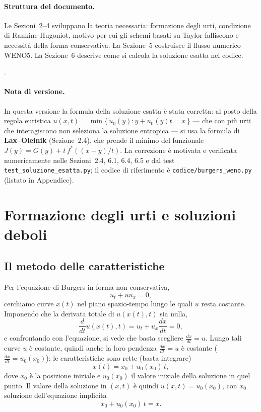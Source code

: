 \documentclass[12pt]{article}
\begin{document}
\paragraph{Struttura del documento.} Le Sezioni~2--4 sviluppano la teoria necessaria: formazione degli urti, condizione di Rankine-Hugoniot, motivo per cui gli schemi basati su Taylor falliscono e necessità della forma conservativa. La Sezione~5 costruisce il flusso numerico WENO5. La Sezione~6 descrive come si calcola la soluzione esatta nel codice. .

\paragraph{Nota di versione.} In questa versione la formula della soluzione esatta è stata
corretta: al posto della regola euristica
\(u(x,t)=\min\{\,u_0(y): y+u_0(y)t=x\,\}\) — che con più urti che interagiscono non
seleziona la soluzione entropica — si usa la formula di \textbf{Lax--Oleinik}
(Sezione~2.4), che prende il minimo del funzionale \(J(y)=G(y)+t\,f^*((x-y)/t)\).
La correzione è motivata e verificata numericamente nelle Sezioni~2.4, 6.1, 6.4, 6.5 e
dal test \texttt{test\_soluzione\_esatta.py}; il codice di riferimento è
\texttt{codice/burgers\_weno.py} (listato in Appendice).

\newpage

\section{Formazione degli urti e soluzioni deboli}

\subsection{Il metodo delle caratteristiche}

Per l'equazione di Burgers in forma non conservativa,
\[
u_t + u u_x = 0,
\]
cerchiamo curve $x(t)$ nel piano spazio-tempo lungo le quali $u$ resta costante. Imponendo che la derivata totale di $u(x(t),t)$ sia nulla,
\[
\frac{d}{dt}u(x(t),t) = u_t + u_x \frac{dx}{dt} = 0,
\]
e confrontando con l'equazione, si vede che basta scegliere $\frac{dx}{dt} = u$. Lungo tali curve $u$ è costante, quindi anche la loro pendenza $\frac{dx}{dt}=u$ è costante ($\frac{dx}{dt}=u_0(x_0)$): le caratteristiche sono rette (basta integrare)
\[
x(t) = x_0 + u_0(x_0)\,t,
\]
dove $x_0$ è la posizione iniziale e $u_0(x_0)$ il valore iniziale della soluzione in quel punto. Il valore della soluzione in $(x,t)$ è quindi $u(x,t) = u_0(x_0)$, con $x_0$ soluzione dell'equazione implicita
\[
x_0 + u_0(x_0)\,t = x. \tag{2.1}
\]
\end{document}
